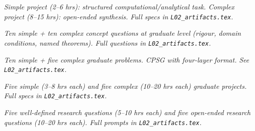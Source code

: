 \begin{tcolorbox}[ugprobbox, title={SPJU + CPJU · L02 · Tiers 2–3}]
\textit{Simple project (2–6 hrs): structured computational/analytical task.
Complex project (8–15 hrs): open-ended synthesis.
Full specs in \texttt{L02_artifacts.tex}.}
\end{tcolorbox}

\begin{tcolorbox}[gradconceptbox, title={SCQG + CCQG · L02 · Tiers 4–5}]
\textit{Ten simple + ten complex concept questions at graduate level (rigour, domain
conditions, named theorems). Full questions in \texttt{L02_artifacts.tex}.}
\end{tcolorbox}

\begin{tcolorbox}[gradprobbox, title={SPSG + CPSG · L02 · Tiers 4–5}]
\textit{Ten simple + five complex graduate problems.
CPSG with four-layer format. See \texttt{L02_artifacts.tex}.}
\end{tcolorbox}

\begin{tcolorbox}[gradprobbox, title={SPJG (×5) + CPJG (×5) · L02 · Tiers 4–5}]
\textit{Five simple (3–8 hrs each) and five complex (10–20 hrs each) graduate projects.
Full specs in \texttt{L02_artifacts.tex}.}
\end{tcolorbox}

\begin{tcolorbox}[researchbox, title={WRQ (×5) + ORQ (×5) · L02 · Tiers 4–5}]
\textit{Five well-defined research questions (5–10 hrs each) and five open-ended
research questions (10–20 hrs each). Full prompts in \texttt{L02_artifacts.tex}.}
\end{tcolorbox}
